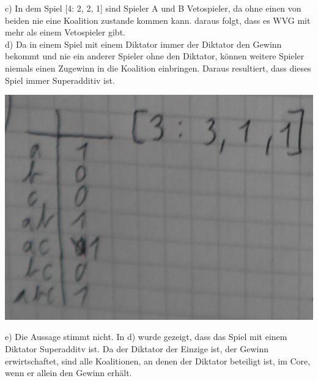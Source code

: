 \documentclass[a4paper, 11pt]{article}
\begin{document}
c) In dem Spiel [4: 2, 2, 1] sind Spieler A und B Vetospieler, da ohne einen
        von beiden nie eine Koalition zustande kommen kann. daraus folgt, dass es
        WVG mit mehr als einem Vetospieler gibt.\\

d) Da in einem Spiel mit einem Diktator immer der Diktator den Gewinn bekommt
        und nie ein anderer Spieler ohne den Diktator, können weitere Spieler niemals
        einen Zugewinn in die Koalition einbringen. Daraus resultiert, dass dieses
        Spiel immer Superadditiv ist.

\begin{center}
\includegraphics[scale=0.5]{aufgabeD}\\
\end{center}

e) Die Aussage stimmt nicht. In d) wurde gezeigt, dass das Spiel mit einem
        Diktator Superadditv ist. Da der Diktator der Einzige ist, der Gewinn
        erwirtschaftet, sind alle Koalitionen, an denen der Diktator beteiligt ist,
        im Core, wenn er allein den Gewinn erhält.\\
\end{document}
